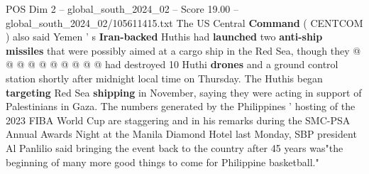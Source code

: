 \begin{textsample}{POS Dim 2 – global\_south\_2024\_02 – Score 19.00 – global\_south\_2024\_02/105611415.txt}
The US Central \textbf{Command} ( CENTCOM ) also said Yemen ' s \textbf{Iran-backed} Huthis had \textbf{launched} two \textbf{anti-ship} \textbf{missiles} that were possibly aimed at a cargo ship in the Red Sea, though they @ @ @ @ @ @ @ @ @ @ had destroyed 10 Huthi \textbf{drones} and a ground control station shortly after midnight local time on Thursday.
The Huthis began \textbf{targeting} Red Sea \textbf{shipping} in November, saying they were acting in support of Palestinians in Gaza.
The numbers generated by the Philippines ' hosting of the 2023 FIBA World Cup are staggering and in his remarks during the SMC-PSA Annual Awards Night at the Manila Diamond Hotel last Monday, SBP president Al Panlilio said bringing the event back to the country after 45 years was"the beginning of many more good things to come for Philippine basketball."

\end{textsample}
